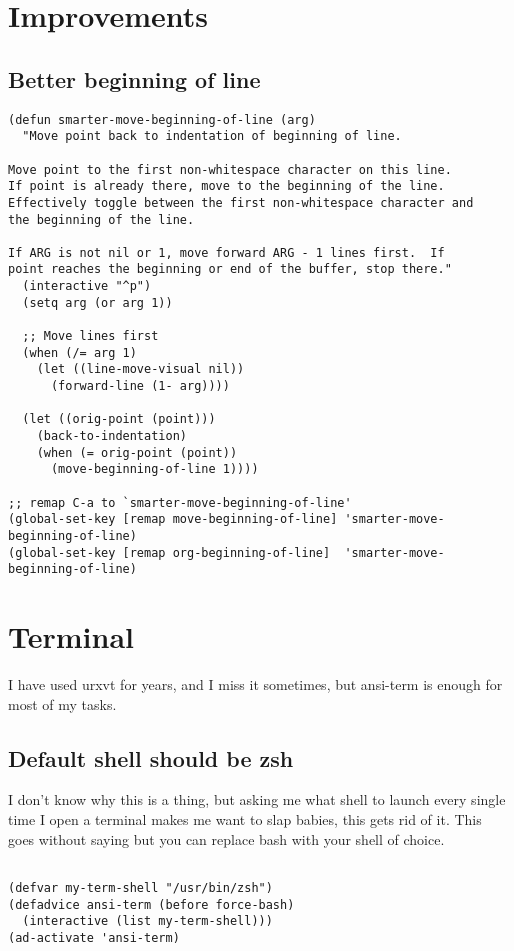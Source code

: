 \documentclass[12pt]{article}
\begin{document}
\section{Improvements}
\label{sec:org32bafad}
\subsection{Better beginning of line}
\label{sec:orga32abca}

\begin{verbatim}
(defun smarter-move-beginning-of-line (arg)
  "Move point back to indentation of beginning of line.

Move point to the first non-whitespace character on this line.
If point is already there, move to the beginning of the line.
Effectively toggle between the first non-whitespace character and
the beginning of the line.

If ARG is not nil or 1, move forward ARG - 1 lines first.  If
point reaches the beginning or end of the buffer, stop there."
  (interactive "^p")
  (setq arg (or arg 1))

  ;; Move lines first
  (when (/= arg 1)
    (let ((line-move-visual nil))
      (forward-line (1- arg))))

  (let ((orig-point (point)))
    (back-to-indentation)
    (when (= orig-point (point))
      (move-beginning-of-line 1))))

;; remap C-a to `smarter-move-beginning-of-line'
(global-set-key [remap move-beginning-of-line] 'smarter-move-beginning-of-line)
(global-set-key [remap org-beginning-of-line]  'smarter-move-beginning-of-line)
\end{verbatim}

\section{Terminal}
\label{sec:org03d0dbd}

I have used urxvt for years, and I miss it sometimes, but ansi-term is enough for most of my tasks.
\subsection{Default shell should be zsh}
\label{sec:org3aa3aeb}

I don’t know why this is a thing, but asking me what shell to launch every single time I open a terminal makes me want to slap babies, this gets rid of it. This goes without saying but you can replace bash with your shell of choice.
\begin{verbatim}

(defvar my-term-shell "/usr/bin/zsh")
(defadvice ansi-term (before force-bash)
  (interactive (list my-term-shell)))
(ad-activate 'ansi-term)
\end{verbatim}
\end{document}
